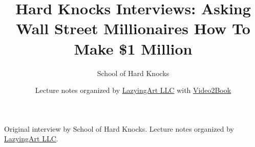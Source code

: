 \documentclass[11pt,oneside]{book}
\begin{document}
\frontmatter
\title{Hard Knocks Interviews: Asking Wall Street Millionaires How To Make \$1 Million}
\author{School of Hard Knocks}
\date{Lecture notes organized by \href{https://lazying.art}{LazyingArt LLC} with \href{https://github.com/lachlanchen/Video2Book}{Video2Book}}
\maketitle
\begin{center}
\small Original interview by School of Hard Knocks. Lecture notes organized by \href{https://lazying.art}{LazyingArt LLC}.
\end{center}
\clearpage
\mainmatter

\end{document}
